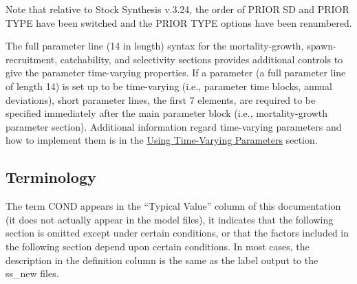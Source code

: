 Note that relative to Stock Synthesis v.3.24, the order of PRIOR SD and PRIOR TYPE have been switched and the PRIOR TYPE options have been renumbered.

The full parameter line (14 in length) syntax for the mortality-growth, spawn-recruitment, catchability, and selectivity sections provides additional controls to give the parameter time-varying properties. If a parameter (a full parameter line of length 14) is set up to be time-varying (i.e., parameter time blocks, annual deviations), short parameter lines, the first 7 elements, are required to be specified immediately after the main parameter block (i.e., mortality-growth parameter section). Additional information regard time-varying parameters and how to implement them is in the \hyperlink{TVpara}{Using Time-Varying Parameters} section.


\subsection{Terminology}
The term COND appears in the ``Typical Value'' column of this documentation (it does not actually appear in the model files), it indicates that the following section is omitted except under certain conditions, or that the factors included in the following section depend upon certain conditions. In most cases, the description in the definition column is the same as the label output to the ss\_new files.

